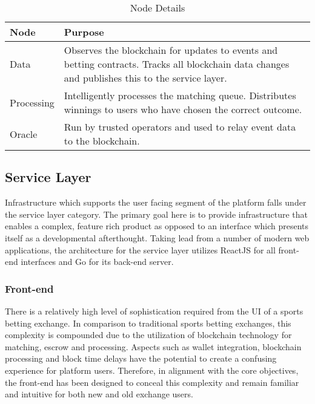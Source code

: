 \documentclass{article}
\begin{document}
\begin{table}[!htb]
\caption{Node Details}

\begin{tabularx}{\textwidth}{ p{3cm}  p{8.4cm}}
\bfseries{Node} & \bfseries{Purpose} \\
\hline

Data & Observes the blockchain for updates to events and betting contracts. \newline Tracks all blockchain data changes and publishes this to the service layer. \\ 
\hline

Processing & Intelligently processes the matching queue. \newline Distributes winnings to users who have chosen the correct outcome. \\   \hline

Oracle & Run by trusted operators and used to relay event data to the blockchain. \\

\hline

\end{tabularx}
\label{table:nodes}
\end{table}

	\subsection{Service Layer}
Infrastructure which supports the user facing segment of the platform falls under the service layer category. The primary goal here is to provide infrastructure that enables a complex, feature rich product as opposed to an interface which presents itself as a developmental afterthought. Taking lead from a number of modern web applications, the architecture for the service layer utilizes ReactJS for all front-end interfaces and Go for its back-end server.  

		\subsubsection{Front-end}	
There is a relatively high level of sophistication required from the UI of a sports betting exchange. In comparison to traditional sports betting exchanges, this complexity is compounded due to the utilization of blockchain technology for matching, escrow and processing. Aspects such as wallet integration, blockchain processing and block time delays have the potential to create a confusing experience for platform users. Therefore, in alignment with the core objectives, the front-end has been designed to conceal this complexity and remain familiar and intuitive for both new and old exchange users. 
\end{document}
